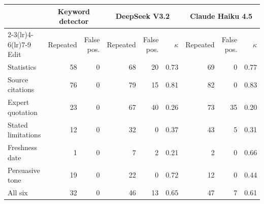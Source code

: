 \begin{tabular}{@{}lrrrrrrrr@{}}
\toprule
 & \multicolumn{2}{c}{Keyword detector} & \multicolumn{3}{c}{DeepSeek V3.2} & \multicolumn{3}{c}{Claude Haiku 4.5} \\
\cmidrule(lr){2-3}\cmidrule(lr){4-6}\cmidrule(lr){7-9}
Edit & Repeated & False pos. & Repeated & False pos. & $\kappa$ & Repeated & False pos. & $\kappa$ \\
\midrule
Statistics & 58 & 0 & 68 & 20 & 0.73 & 69 & 0 & 0.77 \\
Source citations & 76 & 0 & 79 & 15 & 0.81 & 82 & 0 & 0.83 \\
Expert quotation & 23 & 0 & 67 & 40 & 0.26 & 73 & 35 & 0.20 \\
Stated limitations & 12 & 0 & 32 & 0 & 0.37 & 43 & 5 & 0.31 \\
Freshness date & 1 & 0 & 7 & 2 & 0.21 & 2 & 0 & 0.66 \\
Persuasive tone & 19 & 0 & 22 & 0 & 0.72 & 12 & 0 & 0.44 \\
\midrule
All six & 32 & 0 & 46 & 13 & 0.65 & 47 & 7 & 0.61 \\
\bottomrule
\end{tabular}
